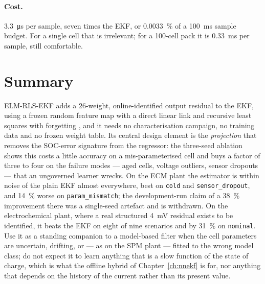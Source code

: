 \paragraph{Cost.}  \SI{3.3}{\micro\second} per sample, seven times the EKF, or
\SI{0.0033}{\percent} of a \SI{100}{\milli\second} sample budget.  For a single cell that is
irrelevant; for a \num{100}-cell pack it is \SI{0.33}{\milli\second} per sample, still comfortable.

\section{Summary}
ELM-RLS-EKF adds a $26$-weight, online-identified output residual to the EKF, using a frozen random
feature map \citep{huang2006elm} with a direct linear link \citep{pao1994rvfl} and recursive least
squares with forgetting \citep{ljung1999}, and it needs no characterisation campaign, no training
data and no frozen weight table.  Its central design element is the \emph{projection} that removes
the SOC-error signature from the regressor: the three-seed ablation shows this costs a little
accuracy on a mis-parameterised cell and buys a factor of three to four on the failure modes ---
aged cells, voltage outliers, sensor dropouts --- that an ungoverned learner wrecks.  On the ECM
plant the estimator is within noise of the plain EKF almost everywhere, best on \texttt{cold} and
\texttt{sensor\_dropout}, and \SI{14}{\percent} worse on \texttt{param\_mismatch}; the
development-run claim of a \SI{38}{\percent} improvement there was a single-seed artefact and is
withdrawn.  On the electrochemical plant, where a real structured \SI{4}{\milli\volt} residual
exists to be identified, it beats the EKF on eight of nine scenarios and by \SI{31}{\percent} on
\texttt{nominal}.  Use it as a standing companion to a model-based filter when the cell parameters
are uncertain, drifting, or --- as on the SPM plant --- fitted to the wrong model class; do not
expect it to learn anything that is a slow function of the state of charge, which is what the
offline hybrid of Chapter~\ref{ch:nnekf} is for, nor anything that depends on the history of the
current rather than its present value.
